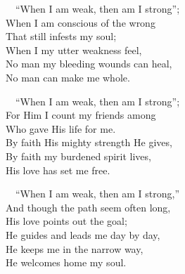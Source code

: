 \documentclass[
]{book}
\begin{document}
~~``When I am weak, then am I strong'';\\
\hspace*{0.333em}\hspace*{0.333em}When I am conscious of the wrong\\
\hspace*{0.333em}\hspace*{0.333em}That still infests my soul;\\
\hspace*{0.333em}\hspace*{0.333em}When I my utter weakness feel,\\
\hspace*{0.333em}\hspace*{0.333em}No man my bleeding wounds can heal,\\
\hspace*{0.333em}\hspace*{0.333em}No man can make me whole.

~~``When I am weak, then am I strong'';\\
\hspace*{0.333em}\hspace*{0.333em}For Him I count my friends among\\
\hspace*{0.333em}\hspace*{0.333em}Who gave His life for me.\\
\hspace*{0.333em}\hspace*{0.333em}By faith His mighty strength He gives,\\
\hspace*{0.333em}\hspace*{0.333em}By faith my burdened spirit lives,\\
\hspace*{0.333em}\hspace*{0.333em}His love has set me free.

~~``When I am weak, then am I strong,''\\
\hspace*{0.333em}\hspace*{0.333em}And though the path seem often long,\\
\hspace*{0.333em}\hspace*{0.333em}His love points out the goal;\\
\hspace*{0.333em}\hspace*{0.333em}He guides and leads me day by day,\\
\hspace*{0.333em}\hspace*{0.333em}He keeps me in the narrow way,\\
\hspace*{0.333em}\hspace*{0.333em}He welcomes home my soul.
\end{document}
